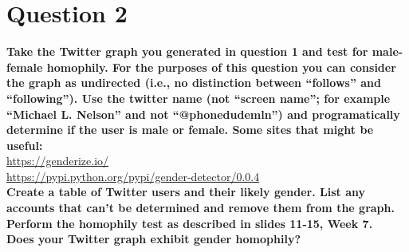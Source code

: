 \chapter{Question 2}
\label{avoiding-uri-aliases} 

\textbf {Take the Twitter graph you generated in question 1 and test for male-female homophily.  For the purposes of this question you can consider the graph as undirected (i.e., no distinction between ``follows'' and ``following'').  Use the twitter name (not ``screen name''; for example ``Michael L. Nelson'' and not ``@phonedude\textunderscore mln'') and programatically determine if the user is male or female.  Some sites that might be useful:}\\
\url{https://genderize.io/}\\
\url{https://pypi.python.org/pypi/gender-detector/0.0.4}\\
\textbf {Create a table of Twitter users and their likely gender.  List any accounts that can't be determined and remove them from the graph.
}\\
\textbf{Perform the homophily test as described in slides 11-15, Week 7.}\\
\textbf{Does your Twitter graph exhibit gender homophily?}

